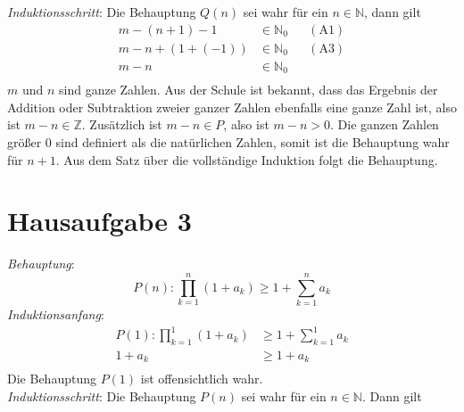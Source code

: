 \documentclass{article}
\begin{document}
\begin{enumerate}[a)]
  \emph{Induktionsschritt}: Die Behauptung $Q(n)$ sei wahr für ein $n \in \mathbb{N}$,
  dann gilt \\
  \begin{align*}
    m - (n + 1) - 1    &\in \mathbb{N}_0 && (\text{A1}) \\
    m - n + (1 + (-1)) &\in \mathbb{N}_0 && (\text{A3}) \\
    m - n              &\in \mathbb{N}_0 \\
  \end{align*}
  $m$ und $n$ sind ganze Zahlen. Aus der Schule ist bekannt, dass das Ergebnis der Addition oder Subtraktion zweier
  ganzer Zahlen ebenfalls eine ganze Zahl ist, also ist $m - n \in \mathbb{Z}$. Zusätzlich ist $m - n \in P$, also ist
  $m - n > 0$. Die ganzen Zahlen größer $0$ sind definiert als die natürlichen Zahlen, somit ist die Behauptung wahr für
  $n + 1$.
  Aus dem Satz über die vollständige Induktion folgt die Behauptung.

\end{enumerate}

\section*{Hausaufgabe 3}

\emph{Behauptung}: \\
\[
  P(n) \colon \prod\limits_{k = 1}^n (1 + a_k) \geq 1 + \sum\limits_{k = 1}^n a_k
\]
\emph{Induktionsanfang}: \\
\begin{align*}
  P(1) \colon \prod\limits_{k = 1}^1 (1 + a_k) &\geq 1 + \sum\limits_{k = 1}^1 a_k \\
                                     1 + a_k  &\geq 1 + a_k \\
\end{align*}
Die Behauptung $P(1)$ ist offensichtlich wahr.  \\

\noindent
\emph{Induktionsschritt}:   Die Behauptung $P(n)$ sei wahr für ein $n \in \mathbb{N}$. Dann gilt \\
\end{document}
